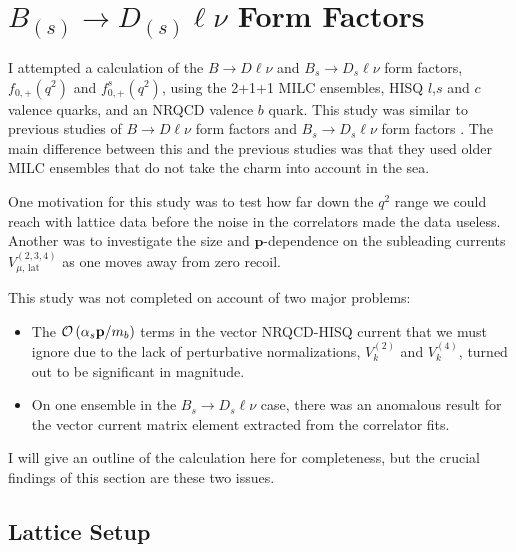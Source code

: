\section{$B_{(s)}\to D_{(s)}\ell\nu$ Form Factors}
\label{sec:BD_BsDs_nrqcd}

I attempted a calculation of the $B\to D\ell\nu$ and $B_{s}\to D_{s}\ell\nu$ form factors, $f_{0,+}(q^2)$ and $f^s_{0,+}(q^2)$, using the 2+1+1 MILC ensembles, HISQ $l$,$s$ and $c$ valence quarks, and an NRQCD valence $b$ quark. This study was similar to previous studies of $B\to D\ell\nu$ form factors \cite{Na:2015kha} and $B_s\to D_s\ell\nu$ form factors \cite{Monahan:2017uby}. The main difference between this and the previous studies was that they used older MILC ensembles that do not take the charm into account in the sea.

One motivation for this study was to test how far down the $q^2$ range we could reach with lattice data before the noise in the correlators made the data useless. Another was to investigate the size and ${\textbf{p}}$-dependence on the subleading currents $V^{(2,3,4)}_{\mu,\,\text{lat}}$ as one moves away from zero recoil.

This study was not completed on account of two major problems:
\begin{itemize}
  \item
    The $\mathcal{O}\left( \alpha_s{\textbf{p}}/m_b \right)$ terms in the vector NRQCD-HISQ current that we must ignore due to the lack of perturbative normalizations, $V_{k}^{(2)}$ and $V_{k}^{(4)}$, turned out to be significant in magnitude.
  \item
    On one ensemble in the $B_s\to D_s \ell\nu$ case, there was an anomalous result for the vector current matrix element extracted from the correlator fits.
\end{itemize}
I will give an outline of the calculation here for completeness, but the crucial findings of this section are these two issues.

\subsection{Lattice Setup}

